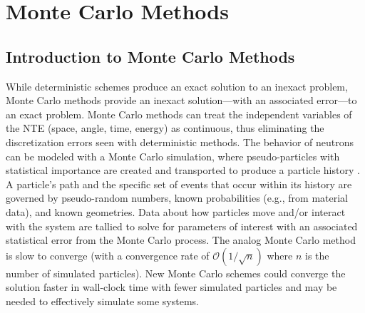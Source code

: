 

\part{Monte Carlo Methods}

\label{part:mc}

\chapter{Introduction to Monte Carlo Methods}

\label{chap:mc_methods_intro}


While deterministic schemes produce an exact solution to an inexact problem, Monte Carlo methods provide an inexact solution---with an associated error---to an exact problem.
Monte Carlo methods can treat the independent variables of the NTE (space, angle, time, energy) as continuous, thus eliminating the discretization errors seen with deterministic methods.
The behavior of neutrons can be modeled with a Monte Carlo simulation, where pseudo-particles with statistical importance are created and transported to produce a particle history \cite{lewis_computational_1984}.
A particle's path and the specific set of events that occur within its history are governed by pseudo-random numbers, known probabilities (e.g., from material data), and known geometries.
Data about how particles move and/or interact with the system are tallied to solve for parameters of interest with an associated statistical error from the Monte Carlo process. 
The analog Monte Carlo method is slow to converge (with a convergence rate of $\mathcal{O}(1/\sqrt{n})$ where $n$ is the number of simulated particles).
New Monte Carlo schemes could converge the solution faster in wall-clock time with fewer simulated particles and may be needed to effectively simulate some systems.


